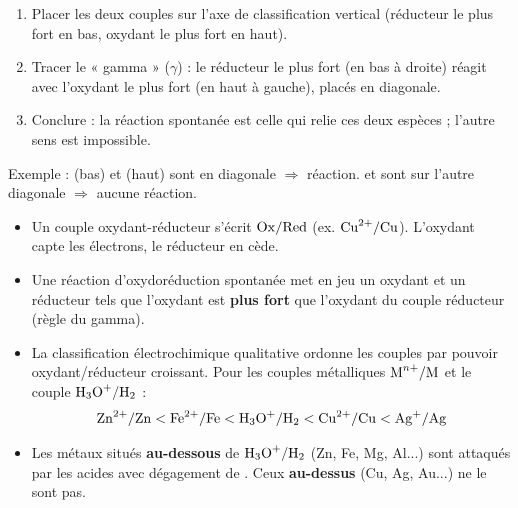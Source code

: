 \documentclass[11pt]{article}
\newcommand{\cle}[1]{{\popxbold\color{popdark}#1}}
\begin{document}
\begin{methode}
\begin{enumerate}
\item Placer les deux couples sur l'axe de classification vertical (réducteur le plus fort en bas, oxydant le plus fort en haut).
\item Tracer le « gamma » ($\gamma$) : le réducteur le plus fort (en bas à droite) réagit avec l'oxydant le plus fort (en haut à gauche), placés en diagonale.
\item Conclure : la réaction spontanée est celle qui relie ces deux espèces ; l'autre sens est impossible.
\end{enumerate}
Exemple :  (bas) et  (haut) sont en diagonale $\Rightarrow$ réaction.  et  sont sur l'autre diagonale $\Rightarrow$ aucune réaction.
\end{methode}

\begin{aretenir}
\begin{itemize}
\item Un \cle{couple oxydant-réducteur} s'écrit $\ce{Ox}/\ce{Red}$ (ex. $\ce{Cu^2+}/\ce{Cu}$). L'oxydant capte les électrons, le réducteur en cède.
\item Une réaction d'oxydoréduction spontanée met en jeu un oxydant et un réducteur tels que l'oxydant est \textbf{plus fort} que l'oxydant du couple réducteur (règle du gamma).
\item La \cle{classification électrochimique qualitative} ordonne les couples par pouvoir oxydant/réducteur croissant. Pour les couples métalliques $\ce{M^{n+}}/\ce{M}$ et le couple $\ce{H3O+}/\ce{H2}$ :
\[ \ce{Zn^2+}/\ce{Zn} < \ce{Fe^2+}/\ce{Fe} < \ce{H3O+}/\ce{H2} < \ce{Cu^2+}/\ce{Cu} < \ce{Ag+}/\ce{Ag} \]
\item Les métaux situés \textbf{au-dessous} de $\ce{H3O+}/\ce{H2}$ (Zn, Fe, Mg, Al...) sont attaqués par les acides avec dégagement de . Ceux \textbf{au-dessus} (Cu, Ag, Au...) ne le sont pas.
\end{itemize}
\end{aretenir}
\end{document}
